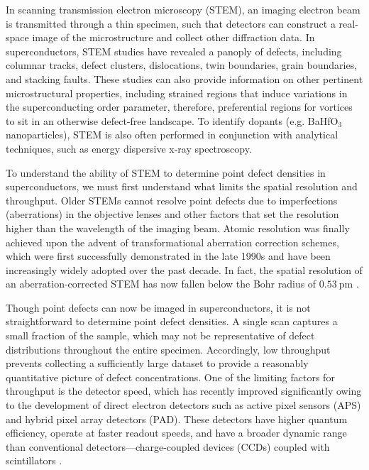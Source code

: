 \documentclass[%
 aip,
 amsmath,amssymb,
 reprint,%
floatfix]{revtex4-1}
\begin{document}
In scanning transmission electron microscopy (STEM), an imaging electron beam is transmitted through a thin specimen, such that detectors can construct a real-space image of the microstructure and collect other diffraction data. In superconductors, STEM studies have revealed a panoply of defects, including columnar tracks, defect clusters, dislocations, twin boundaries, grain boundaries, and stacking faults. These studies can also provide information on other pertinent microstructural properties, including strained regions that induce variations in the superconducting order parameter, therefore, preferential regions for vortices to sit in an otherwise defect-free landscape.  To identify dopants (e.g. BaHfO$_3$ nanoparticles), STEM is also often performed in conjunction with analytical techniques, such as energy dispersive x-ray spectroscopy.


To understand the ability of STEM to determine point defect densities in superconductors, we must first understand what limits the spatial resolution and throughput. Older STEMs cannot resolve point defects due to imperfections (aberrations) in the objective lenses and other factors that set the resolution higher than the wavelength of the imaging beam.  Atomic resolution was finally achieved upon the advent of transformational aberration correction schemes, which were first successfully demonstrated in the late 1990s and have been increasingly widely adopted over the past decade\cite{Batson2002, ROSE20051, Dahmen2009, Ophus2017}.  In fact, the spatial resolution of an aberration-corrected STEM has now fallen below the Bohr radius of $\SI{0.53}{\pico\meter}$ \cite{kisielowski2008, Erni2009, Alem2009, Naoya2019}.  

Though point defects can now be imaged in superconductors, it is not straightforward to determine point defect densities. A single scan captures a small fraction of the sample, which may not be representative of defect distributions throughout the entire specimen. Accordingly, low throughput prevents collecting a sufficiently large dataset to provide a reasonably quantitative picture of defect concentrations. One of the limiting factors for throughput is the detector speed, which has recently improved significantly owing to the development of direct electron detectors such as active pixel sensors (APS) and hybrid pixel array detectors (PAD).  These detectors have higher quantum efficiency, operate at faster readout speeds, and have a broader dynamic range than conventional detectors---charge-coupled devices (CCDs) coupled with scintillators \cite{Ophus2017}. 
\end{document}
